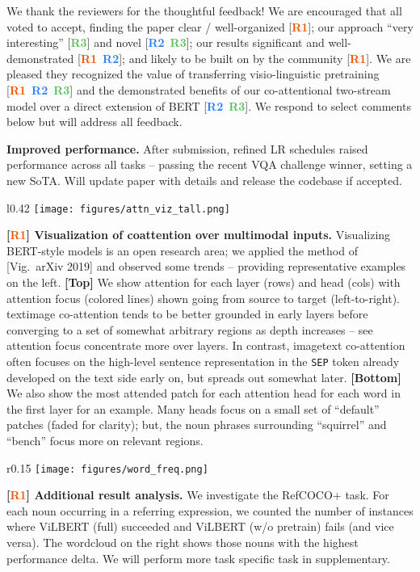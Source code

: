 \documentclass{article}
\newcommand{\xhdr}[1]{\vspace{0pt}\noindent\textbf{#1}}
\newcommand{\one}{\textbf{\textcolor[HTML]{f35400}{R1}}}
\newcommand{\two}{\textbf{\textcolor[HTML]{2980f9}{R2}}}
\newcommand{\three}{\textbf{\textcolor[HTML]{55c055}{R3}}}
\renewcommand{\xhdr}[1]{\noindent \textbf{#1}}
\begin{document}
We thank the reviewers for the thoughtful feedback! We are encouraged that all voted to accept, finding the paper clear / well-organized [\one]; our approach ``very interesting'' [\three] and novel [\two~\three]; our results significant and well-demonstrated [\one~\two]; and likely to be built on by the community [\one]. We are pleased they recognized the value of transferring visio-linguistic pretraining [\one~\two~\three] and the demonstrated benefits of our co-attentional two-stream model over a direct extension of BERT [\two~\three]. We respond to select comments below but will address all feedback.





\xhdr{Improved performance.} After submission, refined LR schedules raised performance across all tasks -- passing the recent VQA challenge winner, setting a new SoTA. Will update paper with details and release the codebase if accepted.
\begin{wrapfigure}{l}{0.42\textwidth}
\vspace{-14pt}
\texttt{[image: figures/attn\_viz\_tall.png]} 
\vspace{-20pt}
\end{wrapfigure}

\vspace{-10pt}\xhdr{[\one] Visualization of coattention over multimodal inputs.} Visualizing BERT-style models is an open research area; we applied the method of [Vig.~arXiv 2019] and observed some trends -- providing representative examples on the left. 
\textbf{[Top]} We show attention for each layer (rows) and head (cols) with attention focus (colored lines) shown going from source to target (left-to-right). textimage co-attention tends to be better grounded in early layers before converging to a set of somewhat arbitrary regions as depth increases -- see attention focus concentrate more over layers. In contrast, imagetext co-attention often focuses on the high-level sentence representation in the \texttt{SEP} token already developed on the text side 
early on, but spreads out somewhat later. \textbf{[Bottom]} We also show the most attended patch for each attention head for each word in the first layer for an example. Many heads focus on a small set of ``default'' patches (faded for clarity); but, the noun phrases surrounding ``squirrel'' and ``bench'' focus more on relevant regions. 

\begin{wrapfigure}{r}{0.15\textwidth}
\vspace{-15pt}
\texttt{[image: figures/word\_freq.png]} 
\vspace{-20pt}
\end{wrapfigure}
\xhdr{[\one] Additional result analysis.} We investigate the RefCOCO+ task. For each noun occurring in a referring expression, we counted the number of instances where ViLBERT (full) succeeded and ViLBERT (w/o pretrain) fails (and vice versa). The wordcloud on the right shows those nouns with the highest performance delta. We will perform more task specific task in supplementary.
\end{document}
